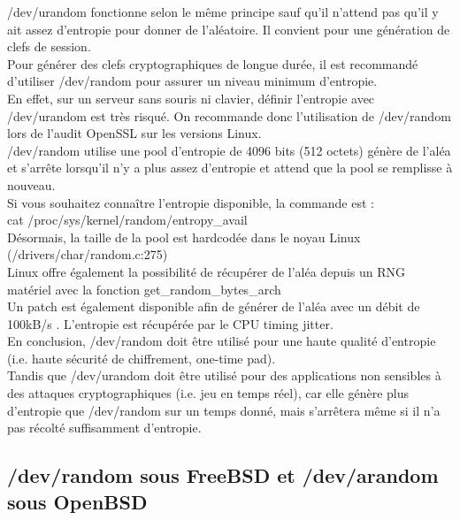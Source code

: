 		/dev/urandom fonctionne selon le même principe sauf qu’il n’attend pas 
		qu’il y ait assez d’entropie pour donner de l’aléatoire. Il convient 
		pour une génération de clefs de session.\\

		Pour générer des clefs cryptographiques de longue durée, il est 
		recommandé d’utiliser /dev/random pour assurer un niveau minimum 
		d’entropie.\\
		
		En effet, sur un serveur sans souris ni clavier, définir l'entropie avec
		/dev/urandom est très risqué. On recommande donc l'utilisation de 
		/dev/random lors de l'audit OpenSSL sur les versions Linux.\\

		/dev/random utilise une pool d’entropie de 4096 bits (512 octets) génère 
		de l’aléa et s’arrête lorsqu’il n’y a plus assez d’entropie et attend 
		que la pool se remplisse à nouveau.\\
		
		Si vous souhaitez connaître l'entropie disponible, la commande est : \\
		cat /proc/sys/kernel/random/entropy\_avail\\

		Désormais, la taille de la pool est hardcodée dans le noyau Linux 
		(/drivers/char/random.c:275)\\
		
		Linux offre également la possibilité de récupérer de l’aléa depuis un 
		RNG matériel avec la fonction get\_random\_bytes\_arch
		\cite{archlinuxRNG}\\
	
		Un patch est également disponible afin de générer de l'aléa avec un 
		débit de 100kB/s \cite{mueller2013rng}. 
		L'entropie est récupérée par le CPU timing jitter.\\
		
		En conclusion, /dev/random doit être utilisé pour une haute qualité
		d'entropie (i.e. haute sécurité de chiffrement, one-time pad).\\
		Tandis que /dev/urandom doit être utilisé pour des applications non
		sensibles à des attaques cryptographiques (i.e. jeu en temps réel),
		car elle génère plus d'entropie que /dev/random sur un temps donné, 
		mais s'arrêtera même si il n'a pas récolté suffisamment d'entropie. 
	

	\subsection{/dev/random sous FreeBSD et /dev/arandom sous OpenBSD}
	
